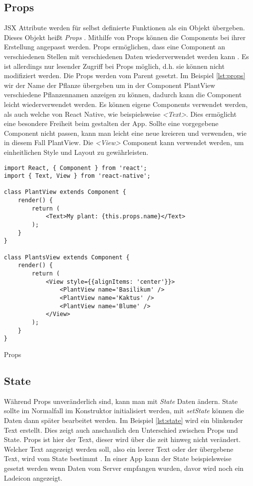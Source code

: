 \subsection{Props}
JSX Attribute werden für selbst definierte Funktionen als ein Objekt übergeben. Dieses Objekt heißt \textit{Props} \cite{facebook_inc._components_2017}. Mithilfe von Props können die Components bei ihrer Erstellung angepasst werden. Props ermöglichen, dass eine Component an verschiedenen Stellen mit verschiedenen Daten wiederverwendet werden kann \cite{facebook_inc._props_2017}. Es ist allerdings nur lesender Zugriff bei Props möglich, d.h. sie können nicht modifiziert werden. Die Props werden vom Parent gesetzt. Im Beispiel \ref{lst:props} wir der Name der Pflanze übergeben um in der Component PlantView verschiedene Pflanzennamen anzeigen zu können, dadurch kann die Component leicht wiederverwendet werden. Es können eigene Components verwendet werden, als auch welche von React Native, wie beispielsweise \textit{<Text>}. Dies ermöglicht eine besondere Freiheit beim gestalten der App. Sollte eine vorgegebene Component nicht passen, kann man leicht eine neue kreieren und verwenden, wie in diesem Fall PlantView. Die \textit{<View>} Component kann verwendet werden, um einheitlichen Style und Layout zu gewährleisten. 

\begin{listing}[H]
    \begin{verbatim}
import React, { Component } from 'react';
import { Text, View } from 'react-native';

class PlantView extends Component {
    render() {
        return (
            <Text>My plant: {this.props.name}</Text>
        );
    }
}

class PlantsView extends Component {
    render() {
        return (
            <View style={{alignItems: 'center'}}>
                <PlantView name='Basilikum' />
                <PlantView name='Kaktus' />
                <PlantView name='Blume' />
            </View>
        );
    }
}

    \end{verbatim}
    \caption{Props}
    \label{lst:props}
\end{listing}

\subsection{State}
Während Props unveränderlich sind, kann man mit \textit{State} Daten ändern. State sollte im Normalfall im Konstruktor initialisiert werden, mit \textit{setState} können die Daten dann später bearbeitet werden. Im Beispiel \ref{lst:state} wird ein blinkender Text erstellt. Dies zeigt auch anschaulich den Unterschied zwischen Props und State. Props ist hier der Text, dieser wird über die zeit hinweg nicht verändert. Welcher Text angezeigt werden soll, also ein leerer Text oder der übergebene Text, wird vom State bestimmt \cite{facebook_inc._state_2017}. In einer App kann der State beispielsweise gesetzt werden wenn Daten vom Server empfangen wurden, davor wird noch ein Ladeicon angezeigt. 

